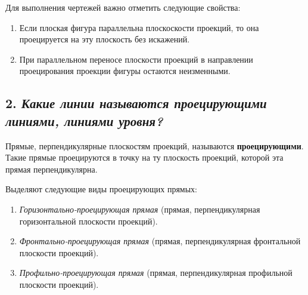 Для выполнения чертежей важно отметить следующие свойства:

\begin{enumerate}
    \item Если плоская фигура параллельна плоскоскости проекций, то она проецируется на эту плоскость без искажений.
    
    
    \item При параллельном переносе плоскости проекций в направлении проецирования проекции фигуры остаются неизменными.
    
\end{enumerate}


\newpage
\subsection*{2. \textit{Какие линии называются проецирующими линиями, линиями уровня?}}

\begin{mainQuote}
    
\end{mainQuote}

Прямые, перпендикулярные плоскостям проекций, называются {\bf проецирующими}. Такие прямые проецируются в точку на ту плоскость проекций, которой эта
прямая перпендикулярна.

Выделяют следующие виды проецирующих прямых:
\begin{enumerate}
    \item \textit {Горизонтально-проецирующая прямая} (прямая, перпендикулярная горизонтальной плоскости проекций).
    

    \item \textit{Фронтально-проецирующая прямая} (прямая, перпендикулярная фронтальной плоскости проекций).


    \item \textit {Профильно-проецирующая прямая} (прямая, перпендикулярная профильной плоскости проекций).


\end{enumerate}


